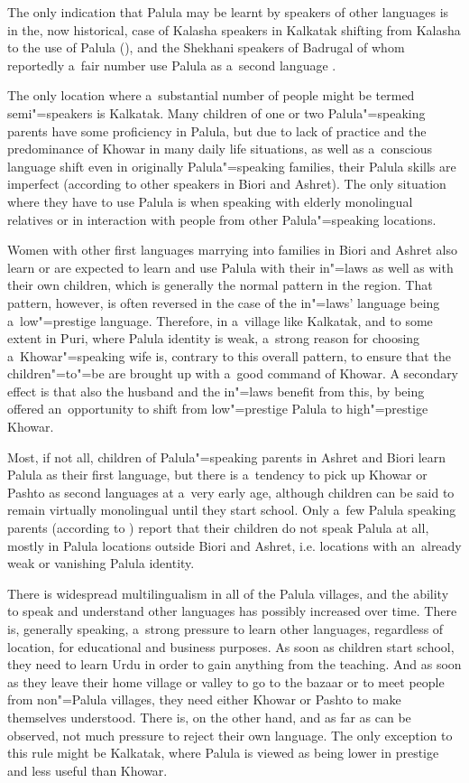 The only indication that Palula may be learnt by speakers of other languages is in the, now historical, case of Kalasha speakers in Kalkatak shifting from Kalasha to the use of Palula (\citealt[55, 79]{decker1992b}), and the Shekhani speakers of Badrugal of whom reportedly a~fair number use Palula as a~second language \citeyear[59]{decker1992b}. 


The only location where a~substantial number of people might be termed semi"=speakers is Kalkatak. Many children of one or two Palula"=speaking parents have some proficiency in Palula, but due to lack of practice and the predominance of Khowar in many daily life situations, as well as a~conscious language shift even in originally Palula"=speaking families, their Palula skills are imperfect (according to other speakers in Biori and Ashret). The only situation where they have to use Palula is when speaking with elderly monolingual relatives or in interaction with people from other Palula"=speaking locations.


Women with other first languages marrying into families in Biori and Ashret also learn or are expected to learn and use Palula with their in"=laws as well as with their own children, which is generally the normal pattern in the region. That pattern, however, is often reversed in the case of the in"=laws' language being a~low"=prestige language. Therefore, in a~village like Kalkatak, and to some extent in Puri, where Palula identity is weak, a~strong reason for choosing a~Khowar"=speaking wife is, contrary to this overall pattern, to ensure that the children"=to"=be are brought up with a~good command of Khowar. A secondary effect is that also the husband and the in"=laws benefit from this, by being offered an~opportunity to shift from low"=prestige Palula to high"=prestige Khowar.


Most, if not all, children of Palula"=speaking parents in Ashret and Biori learn Palula as their first language, but there is a~tendency to pick up Khowar or Pashto as second languages at a~very early age, although children can be said to remain virtually monolingual until they start school. Only a~few Palula speaking parents (according to \citealt{decker1992a}) report that their children do not speak Palula at all, mostly in Palula locations outside Biori and Ashret, i.e. locations with an~already weak or vanishing Palula identity. 


There is widespread multilingualism in all of the Palula villages, and the ability to speak and understand other languages has possibly increased over time. There is, generally speaking, a~strong pressure to learn other languages, regardless of location, for educational and business purposes. As soon as children start school, they need to learn Urdu in order to gain anything from the teaching. And as soon as they leave their home village or valley to go to the bazaar or to meet people from non"=Palula villages, they need either Khowar or Pashto to make themselves understood. There is, on the other hand, and as far as can be observed, not much pressure to reject their own language. The only exception to this rule might be Kalkatak, where Palula is viewed as being lower in prestige and less useful than Khowar.


